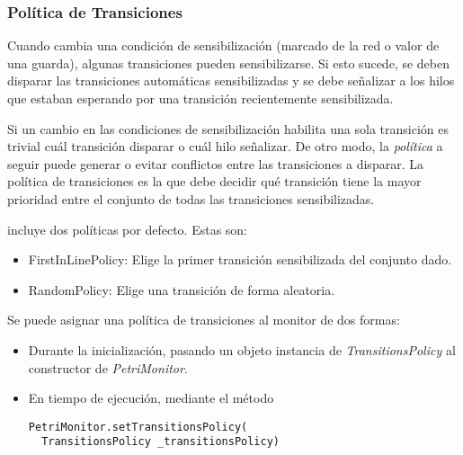 \subsubsection{Política de Transiciones}

Cuando cambia una condición de sensibilización (marcado de la red o valor de
una guarda), algunas transiciones pueden sensibilizarse. Si esto sucede, se
deben disparar las transiciones automáticas sensibilizadas y se debe señalizar a
los hilos que estaban esperando por una transición recientemente sensibilizada.

Si un cambio en las condiciones de sensibilización habilita una sola
transición es trivial cuál transición disparar o cuál hilo señalizar. De otro
modo, la \textit{política} a seguir puede generar o evitar conflictos entre las
transiciones a disparar.
La política de transiciones es la que debe decidir qué transición tiene la mayor
prioridad entre el conjunto de todas las transiciones sensibilizadas.

\javapetriconcurrencymonitor incluye dos políticas por defecto. Estas son:
\begin{itemize}
    \item FirstInLinePolicy: Elige la primer transición sensibilizada del
    conjunto dado.
    \item RandomPolicy: Elige una transición de forma aleatoria.
\end{itemize}

Se puede asignar una política de transiciones al monitor de dos formas:

\begin{itemize}
    \item Durante la inicialización, pasando un objeto instancia de
    \textit{TransitionsPolicy} al constructor de \textit{PetriMonitor}.
    \item En tiempo de ejecución, mediante el método\\ {
    \begin{verbatim}
PetriMonitor.setTransitionsPolicy(
  TransitionsPolicy _transitionsPolicy)
    \end{verbatim}
    }
\end{itemize}

